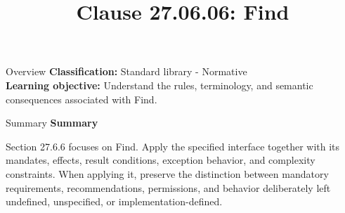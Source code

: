 \documentclass[10pt,letterpaper]{article}
\title{Clause 27.06.06: Find}
\author{}
\date{}
\begin{document}
\maketitle
\begin{CornellOverviewBox}{Overview}
\textbf{Classification:} Standard library - Normative\\[2pt]
\textbf{Learning objective:} Understand the rules, terminology, and semantic consequences associated with Find.
\end{CornellOverviewBox}\begin{CornellSummaryBox}{Summary}
{\sffamily\bfseries\color{Accent} Summary}\par\vspace{3pt}Section 27.6.6 focuses on Find. Apply the specified interface together with its mandates, effects, result conditions, exception behavior, and complexity constraints. When applying it, preserve the distinction between mandatory requirements, recommendations, permissions, and behavior deliberately left undefined, unspecified, or implementation-defined.
\end{CornellSummaryBox}
\end{document}
